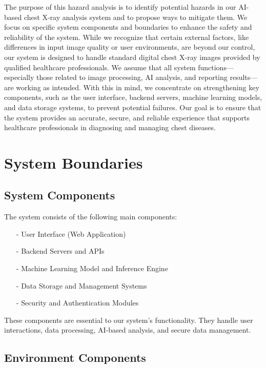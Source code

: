 \documentclass{article}
\begin{document}
The purpose of this hazard analysis is to identify potential hazards in our AI-based chest X-ray analysis system and to propose ways to mitigate them. We focus on specific system components and boundaries to enhance the safety and reliability of the system. While we recognize that certain external factors, like differences in input image quality or user environments, are beyond our control, our system is designed to handle standard digital chest X-ray images provided by qualified healthcare professionals.
\newline
We assume that all system functions—especially those related to image processing, AI analysis, and reporting results—are working as intended. With this in mind, we concentrate on strengthening key components, such as the user interface, backend servers, machine learning models, and data storage systems, to prevent potential failures. Our goal is to ensure that the system provides an accurate, secure, and reliable experience that supports healthcare professionals in diagnosing and managing chest diseases.

\section{System Boundaries}

\subsection{System Components}

The system consists of the following main components:

\begin{itemize}
    \item[-] User Interface (Web Application)
    \item[-] Backend Servers and APIs
    \item[-] Machine Learning Model and Inference Engine
    \item[-] Data Storage and Management Systems
    \item[-] Security and Authentication Modules
\end{itemize}
These components are essential to our system's functionality. They handle user interactions, data processing, AI-based analysis, and secure data management.

\subsection{Environment Components}
\end{document}
